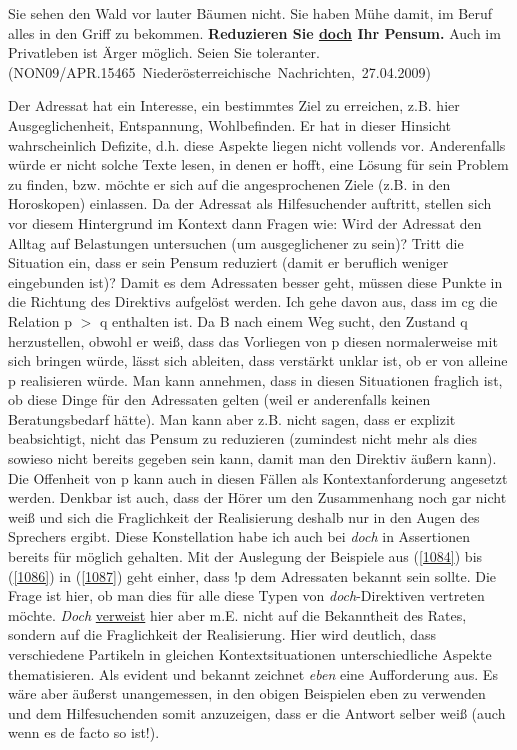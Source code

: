 {\begin{exe}
	\ex\label{1086} 
	\scriptsize
	Sie sehen den Wald vor lauter Bäumen nicht. Sie haben Mühe damit, im Beruf alles in den Griff zu bekommen. \textbf{Reduzieren Sie \underline{doch} Ihr 		Pensum.} Auch im Privatleben ist Ärger möglich. Seien Sie toleranter.	
	\hfill\hbox{(NON09/APR.15465 Niederösterreichische Nachrichten, 27.04.2009)} 				     
\end{exe}
Der Adressat hat ein Interesse, ein bestimmtes Ziel zu erreichen, z.B. hier Ausgeglichenheit, Entspannung, Wohlbefinden. Er hat in dieser Hinsicht wahrscheinlich Defizite, d.h. diese Aspekte liegen nicht vollends vor. Anderenfalls würde er nicht solche Texte lesen, in denen er hofft, eine Lösung für sein Problem zu finden, bzw. möchte er sich auf die angesprochenen Ziele (z.B. in den Horoskopen) einlassen. Da der Adressat als Hilfesuchender auftritt, stellen sich vor diesem Hintergrund im Kontext dann Fragen wie: Wird der Adressat den Alltag auf Belastungen untersuchen (um ausgeglichener zu sein)? Tritt die Situation ein, dass er sein Pensum reduziert (damit er beruflich weniger eingebunden ist)? Damit es dem Adressaten besser geht, müssen diese Punkte in die Richtung des Direktivs aufgelöst werden. Ich gehe davon aus, dass im cg die Relation p $>$ q ent\-halten ist. Da B nach einem Weg sucht, den Zustand q herzustellen, obwohl er weiß, dass das Vorliegen von p diesen normalerweise mit sich bringen würde, lässt sich ableiten, dass verstärkt unklar ist, ob er von alleine p realisieren würde. Man kann annehmen, dass in diesen Situationen fraglich ist, ob diese Dinge für den Adressaten gelten (weil er anderenfalls keinen Beratungsbedarf hätte). Man kann aber z.B. nicht sagen, dass er explizit beabsichtigt, nicht das Pensum zu reduzieren (zumindest nicht mehr als dies sowieso nicht bereits gegeben sein kann, damit man den Direktiv äußern kann). Die Offenheit von p kann auch in diesen Fällen als Kontextanforderung angesetzt werden. Denkbar ist auch, dass der Hörer um den Zusammenhang noch gar nicht weiß und sich die Fraglichkeit der Realisierung deshalb nur in den Augen des Sprechers ergibt. Diese Konstellation habe ich auch bei \textit{doch} in Assertionen bereits für möglich gehalten. Mit der Auslegung der Beispiele aus (\ref{1084}) bis (\ref{1086}) in (\ref{1087}) geht einher, dass !p dem Adressaten bekannt sein sollte. Die Frage ist hier, ob man dies für alle diese Typen von \textit{doch}-Direktiven vertreten möchte. \textit{Doch} \underline{verweist} hier aber m.E. nicht auf die Bekanntheit des Rates, sondern auf die Fraglichkeit der Realisierung. Hier wird deutlich, dass verschiedene Partikeln in gleichen Kontextsituationen unterschiedliche Aspekte thematisieren. Als evident und bekannt zeichnet \textit{eben} eine Aufforderung aus. Es wäre aber äußerst unangemessen, in den obigen Beispielen eben zu verwenden und dem Hilfesuchenden somit anzuzeigen, dass er die Antwort selber weiß (auch wenn es de facto so ist!).
	
}
